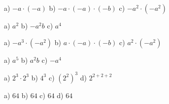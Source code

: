     \begin{tehtava}
        a) $-a\cdot(-a)$ \qquad
        b) $-a\cdot(-a)\cdot(-b)$ \qquad
        c) $-a^2\cdot(-a^2)$
    
        \begin{vastaus}
            a) $a^2$ \qquad
            b) $-a^2b$ \qquad
            c) $a^4$
        \end{vastaus}
    \end{tehtava}

    \begin{tehtava}
        a) $-a^3\cdot(-a^2)$ \qquad
        b) $a\cdot(-a)\cdot(-b)$ \qquad
        c) $a^2\cdot(-a^2)$
        
        \begin{vastaus}
            a) $a^5$ \qquad
            b) $a^2b$ \qquad
            c) $-a^4$
        \end{vastaus}
    \end{tehtava}

    \begin{tehtava}
        a) $2^3\cdot2^3$ \qquad
        b) $4^3$ \qquad
        c) $(2^2)^3$ \qquad
        d) $2^{2+2+2}$

        \begin{vastaus}
            a) $64$ \qquad
            b) $64$ \qquad
            c) $64$ \qquad
            d) $64$
        \end{vastaus}
    \end{tehtava}

